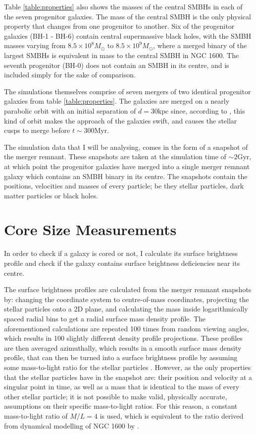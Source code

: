 \documentclass[english, oneside]{HYgradu}
\begin{document}
Table \ref{table:properties} also shows the masses of the central SMBHs in each of the seven progenitor galaxies. The mass of the central SMBH is the only physical property that changes from one progenitor to another. Six of the progenitor galaxies (BH-1 - BH-6) contain central supermassive black holes, with the SMBH masses varying from $8.5 \times 10^8 M_\odot$ to $8.5 \times 10^9 M_\odot$, where a merged binary of the largest SMBHs is equivalent in mass to the central SMBH in NGC 1600. The seventh progenitor (BH-0) does not contain an SMBH in its centre, and is included simply for the sake of comparison.

The simulations themselves comprise of seven mergers of two identical progenitor galaxies from table \ref{table:properties}. The galaxies are merged on a nearly parabolic orbit with an initial separation of $d = 30 \mathrm{kpc}$ since, according to \cite{Rantala2018}, this kind of orbit makes the approach of the galaxies swift, and causes the stellar cusps to merge before $t \sim 300 \mathrm{Myr}$.

The simulation data that I will be analysing, comes in the form of a snapshot of the merger remnant. These snapshots are taken at the simulation time of $\sim 2 \mathrm{Gyr}$, at which point the progenitor galaxies have merged into a single merger remnant galaxy which contains an SMBH binary in its centre. The snapshots contain the positions, velocities and masses of every particle; be they stellar particles, dark matter particles or black holes.

\section{Core Size Measurements}

In order to check if a galaxy is cored or not, I calculate its surface brightness profile and check if the galaxy contains surface brightness deficiencies near its centre.

The surface brightness profiles are calculated from the merger remnant snapshots by: changing the coordinate system to centre-of-mass coordinates, projecting the stellar particles onto a 2D plane, and calculating the mass inside logarithmically spaced radial bins to get a radial surface mass density profile. The aforementioned calculations are repeated 100 times from random viewing angles, which results in 100 slightly different density profile projections. These profiles are then averaged azimuthally, which results in a smooth surface mass density profile, that can then be turned into a surface brightness profile by assuming some mass-to-light ratio for the stellar particles \citep{Rantala2018}. However, as the only properties that the stellar particles have in the snapshot are: their position and velocity at a singular point in time, as well as a mass that is identical to the mass of every other stellar particle; it is not possible to make valid, physically accurate, assumptions on their specific mass-to-light ratios. For this reason, a constant mass-to-light ratio of $M/L = 4$ is used, which is equivalent to the ratio derived from dynamical modelling of NGC 1600 by \cite{Thomas2016}.
\end{document}
